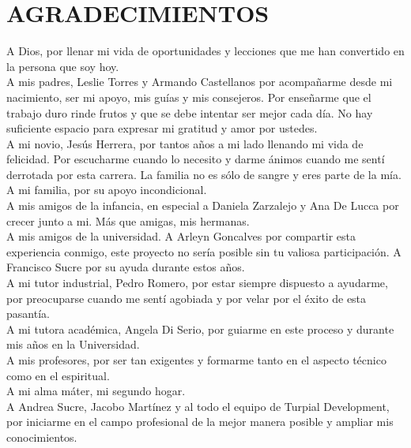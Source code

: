 \chapter*{AGRADECIMIENTOS}

A Dios, por llenar mi vida de oportunidades y lecciones que me han convertido en la persona que soy hoy.\\

A mis padres, Leslie Torres y Armando Castellanos por acompañarme desde mi nacimiento, ser mi apoyo, mis guías y mis consejeros. Por enseñarme que el trabajo duro rinde frutos y que se debe intentar ser mejor cada día. No hay suficiente espacio para expresar mi gratitud y amor por ustedes.\\

A mi novio, Jesús Herrera, por tantos años a mi lado llenando mi vida de felicidad. Por escucharme cuando lo necesito y darme ánimos cuando me sentí derrotada por esta carrera. La familia no es sólo de sangre y eres parte de la mía.\\

A mi familia, por su apoyo incondicional.\\

A mis amigos de la infancia, en especial a Daniela Zarzalejo y Ana De Lucca por crecer junto a mi. Más que amigas, mis hermanas.\\

A mis amigos de la universidad. A Arleyn Goncalves por compartir esta experiencia conmigo, este proyecto no sería posible sin tu valiosa participación. A Francisco Sucre por su ayuda durante estos años.\\

A mi tutor industrial, Pedro Romero, por estar siempre dispuesto a ayudarme, por preocuparse cuando me sentí agobiada y por velar por el éxito de esta pasantía. \\

A mi tutora académica, Angela Di Serio, por guiarme en este proceso y durante mis años en la Universidad.\\

A mis profesores, por ser tan exigentes y formarme tanto en el aspecto técnico como en el espiritual.\\

A mi alma máter, mi segundo hogar.\\

A Andrea Sucre, Jacobo Martínez y al todo el equipo de Turpial Development, por iniciarme en el campo profesional de la mejor manera posible y ampliar mis conocimientos.\\

